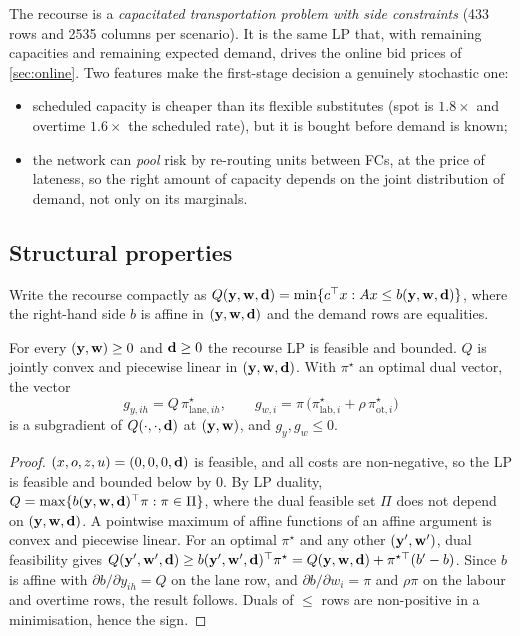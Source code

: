 The recourse is a \emph{capacitated transportation problem with side constraints} (433 rows and 2535 columns per scenario).
It is the same LP that, with remaining capacities and remaining expected demand, drives the online bid prices of \cref{sec:online}.
Two features make the first-stage decision a genuinely stochastic one:
\begin{itemize}
  \item scheduled capacity is cheaper than its flexible substitutes (spot is $1.8\times$ and overtime $1.6\times$ the scheduled rate), but it is bought before demand is known;
  \item the network can \emph{pool} risk by re-routing units between FCs, at the price of lateness, so the right amount of capacity depends on the joint distribution of demand, not only on its marginals.
\end{itemize}

\subsection{Structural properties}
Write the recourse compactly as $Q(\mathbf{y},\mathbf{w},\mathbf{d})=\min\{c^\top x: Ax\le b(\mathbf{y},\mathbf{w},\mathbf{d})\}$, where the right-hand side $b$ is affine in $(\mathbf{y},\mathbf{w},\mathbf{d})$ and the demand rows are equalities.

\begin{proposition}\label{prop:recourse}
For every $(\mathbf{y},\mathbf{w})\ge 0$ and $\mathbf{d}\ge 0$ the recourse LP is feasible and bounded. $Q$ is jointly convex and piecewise linear in $(\mathbf{y},\mathbf{w},\mathbf{d})$. With $\pi^{\star}$ an optimal dual vector, the vector
\begin{equation}\label{eq:subgrad}
  g_{y,ih} = Q\,\pi^{\star}_{\mathrm{lane},ih},\qquad g_{w,i} = \pi\,\big(\pi^{\star}_{\mathrm{lab},i} + \rho\,\pi^{\star}_{\mathrm{ot},i}\big)
\end{equation}
is a subgradient of $Q(\cdot,\cdot,\mathbf{d})$ at $(\mathbf{y},\mathbf{w})$, and $g_{y},g_{w}\le 0$.
\end{proposition}
\begin{proof}
$(x,o,z,u)=(0,0,0,\mathbf{d})$ is feasible, and all costs are non-negative, so the LP is feasible and bounded below by $0$.
By LP duality, $Q = \max\{b(\mathbf{y},\mathbf{w},\mathbf{d})^\top\pi : \pi \in \Pi\}$, where the dual feasible set $\Pi$ does not depend on $(\mathbf{y},\mathbf{w},\mathbf{d})$.
A pointwise maximum of affine functions of an affine argument is convex and piecewise linear.
For an optimal $\pi^\star$ and any other $(\mathbf{y}',\mathbf{w}')$, dual feasibility gives $Q(\mathbf{y}',\mathbf{w}',\mathbf{d})\ge b(\mathbf{y}',\mathbf{w}',\mathbf{d})^\top\pi^\star = Q(\mathbf{y},\mathbf{w},\mathbf{d}) + \pi^{\star\top}(b'-b)$.
Since $b$ is affine with $\partial b/\partial y_{ih}=Q$ on the lane row, and $\partial b/\partial w_i=\pi$ and $\rho\pi$ on the labour and overtime rows, the result follows.
Duals of $\le$ rows are non-positive in a minimisation, hence the sign.
\end{proof}


